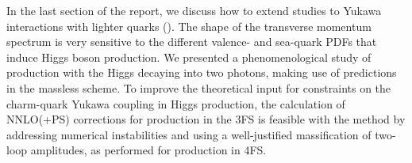 \documentclass[11pt,a4paper]{article}
\begin{document}
In the last section of the report, we discuss how to extend \bbH{} studies to Yukawa interactions with lighter quarks (\qqtoH{}). The shape of the transverse momentum spectrum is very sensitive to the different valence- and sea-quark PDFs that induce Higgs boson production. We presented a phenomenological study of \qqtoH{} production with the Higgs decaying into two photons, making use of \minnlo{} predictions in the massless scheme. To improve the theoretical input for constraints on the charm-quark Yukawa coupling in Higgs production, the calculation of NNLO(+PS) corrections for \ccH{} production in the 3FS is feasible with the \minnlo{} method by addressing numerical instabilities and using a well-justified massification of two-loop amplitudes, as performed for \bbH{} production in 4FS.

\end{document}

